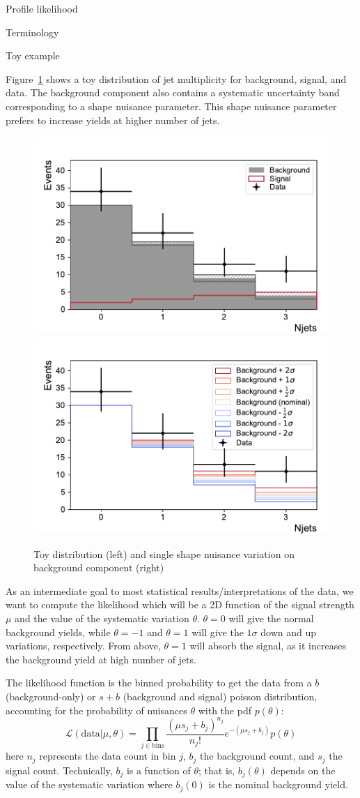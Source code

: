\begin{section}{Profile likelihood}
\begin{subsection}{Terminology}
\end{subsection}

\begin{subsection}{Toy example}

Figure~\ref{fig:toystat:njets} shows a toy distribution of jet multiplicity
for background, signal, and data. The background component also contains a
systematic uncertainty band corresponding to a shape nuisance parameter.
This shape nuisance parameter prefers to increase yields at higher number of jets.

\begin{figure}[!htb]
    \centering
    \includegraphics[width=0.48\linewidth]{figs/toy_statistics/njets.pdf}
    \includegraphics[width=0.48\linewidth]{figs/toy_statistics/backgroundvariations.pdf}
    \caption{
Toy distribution (left) and single shape nuisance variation on background component (right)
    }
    \label{fig:toystat:njets}
\end{figure}
    
As an intermediate goal to most statistical results/interpretations of the data,
we want to compute the likelihood which will be a 2D function of the
signal strength $\mu$ and the value of the systematic variation
$\theta$. $\theta=0$ will give the normal background yields, while
$\theta=-1$ and $\theta=1$ will give the $1\sigma$ down and up
variations, respectively. From above, $\theta=1$ will absorb
 the signal, as it increases the background yield at high number of
jets.

The likelihood function is the binned probability to get the data from a
$b$ (background-only) or $s+b$ (background and signal) poisson distribution, 
accounting for the probability of nuisances $\theta$ with the pdf $p(\theta)$:
\begin{equation}
\mathcal{L}(\mathrm{data}|\mu,\theta)=\prod_{j\in\mathrm{bins}}
\frac{(\mu s_j + b_j)^{n_j}}{n_j!}
e^{-(\mu s_j + b_j)}
p(\theta)
\end{equation}
 here $n_j$ represents the data count in bin $j$, $b_j$ the
background count, and $s_j$ the signal count. Technically, $b_j$ is
a function of $\theta$; that is, $b_j(\theta)$ depends on the value
of the systematic variation where $b_j(0)$ is the nominal background
yield.


\end{subsection}
\end{section}
